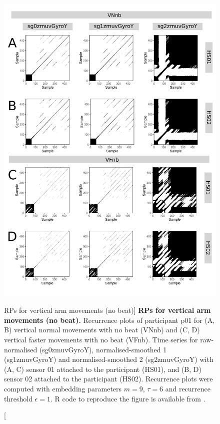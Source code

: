 \begin{figure}
\centering
\includegraphics[height=0.8\textheight]{rps_Vnb_w500}
\caption
	[RPs for vertical arm movements (no beat)]{
	{\bf RPs for vertical arm movements (no beat).}	
	Recurrence plots of participant p01 for 
	(A, B) vertical normal movements with no beat (VNnb) and
	(C, D) vertical faster movements with no beat (VFnb).
	Time series for raw-normalised (sg0zmuvGyroY), 
	normalised-smoothed 1 (sg1zmuvGyroY) and 
	normalised-smoothed 2 (sg2zmuvGyroY) with
	(A, C) sensor 01 attached to the participant (HS01), and
	(B, D) sensor 02 attached to the participant (HS02).
	Recurrence plots were computed with 
	embedding parameters $m=9$, $\tau=6$ and 
	recurrence threshold $\epsilon=1$.
	R code to reproduce the figure is available from \cite{hwum2018}.
        }
    \label{fig:rps_Vnb_w500}
\end{figure}
